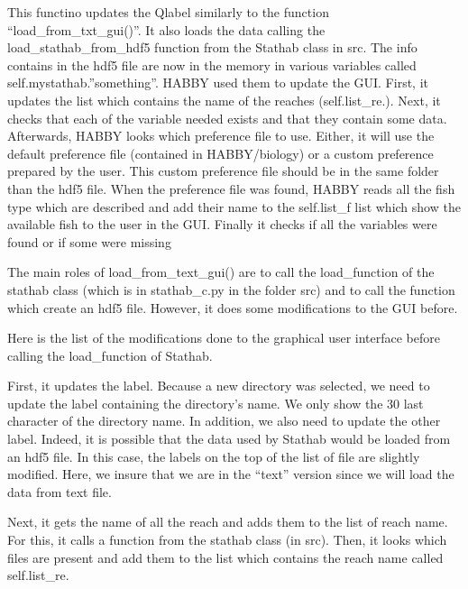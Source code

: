 \documentclass[letterpaper,10pt,english]{sphinxmanual}
\begin{document}
\begin{fulllineitems}
\begin{fulllineitems}
This functino updates the Qlabel similarly to the function “load\_from\_txt\_gui()”.
It also loads the data calling the load\_stathab\_from\_hdf5 function from the Stathab class in src. The info
contains in the hdf5 file are now in the memory in various variables called self.mystathab.”something”.
HABBY used them to update the GUI. First, it updates the list which contains the name of the reaches
(self.list\_re.). Next, it checks that each of the variable needed exists and that they contain some data.
Afterwards, HABBY looks which preference file to use. Either, it will use the default preference file
(contained in HABBY/biology) or a custom preference prepared by the user. This custom preference
file should be in the same folder than the hdf5 file. When the preference file was found, HABBY reads all
the fish type which are described and add their name to the self.list\_f list which show the available fish
to the user in the GUI. Finally it checks if all the variables were found or if some were missing

\end{fulllineitems}


\begin{fulllineitems}
\label{\detokenize{index:src_GUI.stathab_GUI.StathabW.load_from_txt_gui}}
The main roles of load\_from\_text\_gui() are to call the load\_function of the stathab class (which is in
stathab\_c.py in the folder src) and to call the function which create an hdf5 file. However, it does some
modifications to the GUI before.


Here is the list of the modifications done to the graphical user interface before calling the load\_function of
Stathab.

First, it updates the label. Because a new directory was selected, we need to update the label containing the
directory’s name. We only show the 30 last character of the directory name. In addition, we also need to update
the other label. Indeed, it is possible that the data used by Stathab would be loaded from an hdf5 file.
In this case, the labels on the top of the list of file are slightly modified. Here, we insure that we are in
the “text” version since we will load the data from text file.

Next, it gets the name of all the reach and adds them to the list of reach name. For this, it calls a function
from the stathab class (in src). Then, it looks which files are present and add them to the list which contains
the reach name called self.list\_re.


\end{fulllineitems}
\end{fulllineitems}
\end{document}
